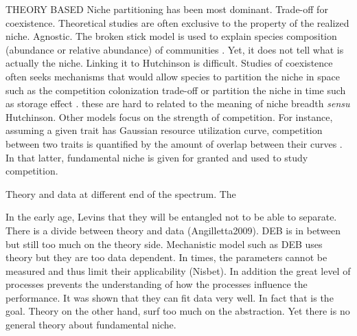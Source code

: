 THEORY BASED
Niche partitioning has been most dominant.
Trade-off for coexistence.
Theoretical studies are often exclusive to the property of the realized niche. 
Agnostic. 
The broken stick model is used to explain species composition (abundance or relative abundance) of communities \citep{MacArthur1957}.
Yet, it does not tell what is actually the niche.
Linking it to Hutchinson is difficult.
Studies of coexistence often seeks mechanisms that would allow species to partition the niche in space such as the competition colonization trade-off \citep[e.g.,][]{Levins1971,Tilman1994} or partition the niche in time such as storage effect \citep{Skellam1951, Chesson2000}. %
these are hard to related to the meaning of niche breadth \textit{sensu} Hutchinson.
Other models focus on the strength of competition.
For instance, assuming a given trait has Gaussian resource utilization curve, competition  between two traits is quantified by the amount of overlap between their curves \citep{MacArthur1967, Roughgarden1979}.%
In that latter, fundamental niche is given for granted and used to study competition.

Theory and data at different end of the spectrum.
The

In the early age, Levins that they will be entangled not to be able to separate.
There is a divide between theory and data (Angilletta2009).
DEB is in between but still too much on the theory side.
Mechanistic model such as DEB uses theory but they are too data dependent.
In times, the parameters cannot be measured and thus limit their applicability (Nisbet).
In addition the great level of processes prevents the understanding of how the processes influence the performance.
It was shown that they can fit data very well.
In fact that is the goal.
Theory on the other hand, surf too much on the abstraction.
Yet there is no general theory about fundamental niche.


